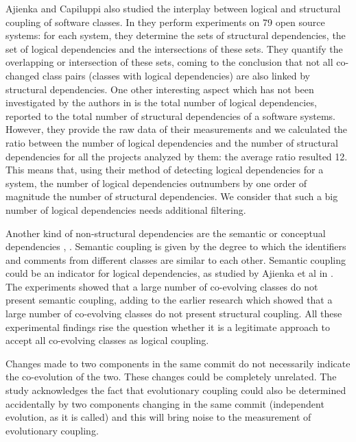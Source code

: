 \documentclass[a4paper,twoside]{article}
\begin{document}
Ajienka and Capiluppi also studied the interplay between logical and structural coupling of software classes. In \cite{DBLP:journals/jss/AjienkaC17} they  perform experiments on 79 open source systems: for each system, they determine the sets of structural dependencies, the set of logical dependencies and the intersections of these sets. They quantify the overlapping or intersection of these sets, coming to the conclusion that not all co-changed class pairs (classes with logical dependencies) are also linked by structural dependencies. One other interesting aspect which has not been investigated by the authors in \cite{DBLP:journals/jss/AjienkaC17}  is the total number of logical dependencies, reported to the total number of structural dependencies of a software systems. However, they provide the raw data of their measurements and we calculated the ratio between the number of logical dependencies and the number of structural dependencies for all the projects analyzed by them: the average ratio resulted 12.  This means that, using their method of detecting logical dependencies for a system, the number of logical dependencies outnumbers by one order of magnitude the number of structural dependencies. We consider that such a big number of logical dependencies needs additional filtering. 


Another kind of non-structural dependencies are the semantic or conceptual dependencies \cite{Poshyvanyk2009}, \cite{posh2010}. Semantic coupling is given by the degree to which the identifiers
and comments from different classes are similar to each other. Semantic coupling could be an indicator for logical dependencies, as studied by Ajienka et al in \cite{DBLP:journals/ese/AjienkaCC18}. The experiments showed that a large number of co-evolving classes do not present semantic coupling, adding to the earlier research which showed that a large number of co-evolving classes do not present structural coupling. All these experimental findings rise the question whether it is a legitimate approach to accept all co-evolving classes as logical coupling.


Changes made to two components in the same commit do not necessarily indicate the co-evolution of the two. These changes could be completely unrelated. The study \cite{Yu2007} acknowledges the fact that evolutionary coupling could also be determined accidentally by two components changing in the same commit (independent evolution, as it is called) and this will bring noise to the measurement of evolutionary coupling. 
\end{document}
